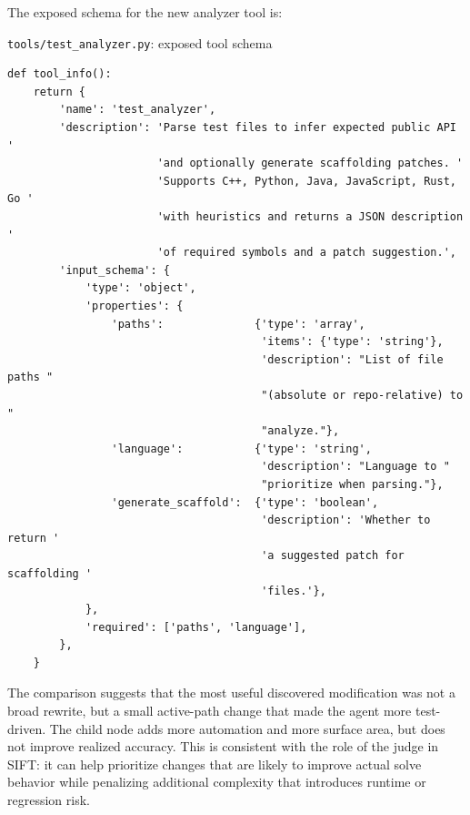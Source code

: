 \documentclass{article}
\begin{document}
The exposed schema for the new analyzer tool is:

\begin{codebox}{\texttt{tools/test\_analyzer.py}: exposed tool schema}
\begin{lstlisting}[style=pystyle]
def tool_info():
    return {
        'name': 'test_analyzer',
        'description': 'Parse test files to infer expected public API '
                       'and optionally generate scaffolding patches. '
                       'Supports C++, Python, Java, JavaScript, Rust, Go '
                       'with heuristics and returns a JSON description '
                       'of required symbols and a patch suggestion.',
        'input_schema': {
            'type': 'object',
            'properties': {
                'paths':              {'type': 'array',
                                       'items': {'type': 'string'},
                                       'description': "List of file paths "
                                       "(absolute or repo-relative) to "
                                       "analyze."},
                'language':           {'type': 'string',
                                       'description': "Language to "
                                       "prioritize when parsing."},
                'generate_scaffold':  {'type': 'boolean',
                                       'description': 'Whether to return '
                                       'a suggested patch for scaffolding '
                                       'files.'},
            },
            'required': ['paths', 'language'],
        },
    }
\end{lstlisting}
\end{codebox}

The comparison suggests that the most useful discovered modification was not a broad rewrite, but a small active-path change that made the agent more test-driven. The child node adds more automation and more surface area, but does not improve realized accuracy. This is consistent with the role of the judge in SIFT: it can help prioritize changes that are likely to improve actual solve behavior while penalizing additional complexity that introduces runtime or regression risk.


\newpage
\end{document}
